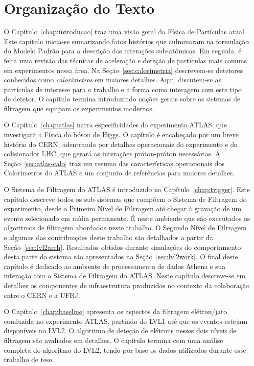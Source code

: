 \section{Organização do Texto}

O Capítulo~\ref{chap:introducao} traz uma visão geral da Física de Partículas
atual. Este capítulo inicia-se sumarizando fatos histórios que culminaram na
formulação do Modelo Padrão para a descrição das interações sub-atômicas. Em
seguida, é feita uma revisão das técnicas de aceleração e deteção de
partículas mais comuns em experimentos nessa área. Na
Seção~\ref{sec:calorimetria} descrevem-se detetores conhecidos como
\textit{calorímetros} em maiores detalhes. Aqui, discutem-se as partículas de
interesse para o trabalho e a forma como interagem com este tipo de detetor. O
capítulo termina introduzindo noções gerais sobre os sistemas de filtragem que
equipam os experimentos modernos.

O Capítulo~\ref{chap:atlas} narra especificidades do experimento ATLAS, que
investigará a Física do bóson de Higgs. O capítulo é encabeçado por um breve
histório do CERN, adentrando por detalhes operacionais do experimento e do
colisionador LHC, que gerará as interações próton-próton necessárias. A
Seção~\ref{sec:atlas-calo} traz um resumo das características operacionais dos
Calorímetros do ATLAS e um conjunto de referências para maiores detalhes.

O Sistema de Filtragem do ATLAS é introduzido no
Capítulo~\ref{chap:trigger}. Este capítulo descreve todos os sub-sistemas que
compõem o Sistema de Filtragem do experimento, desde o Primeiro Nível de
Filtragem até chegar à gravação de um evento selecionado em mídia
permanente. É neste ambiente que são executados os algoritmos de filtragem
abordados neste trabalho. O Segundo Nível de Filtragem e algumas das
contribuições deste trabalho são detalhados a partir da
Seção~\ref{sec:lvl2arch}. Resultados obtidos durante simulações do
comportamento desta parte do sistema são apresentados na
Seção~\ref{sec:lvl2work}. O final deste capítulo é dedicado ao ambiente de
processamento de dados Athena e sua interação com o Sistema de Filtragem do
ATLAS. Neste capítulo descreve-se em detalhes os componentes de infraestrutura
produzidos no contexto da colaboração entre o CERN e a UFRJ.

O Capítulo~\ref{chap:baseline} apresenta os aspectos da filtragem elétron/jato
conduzida no experimento ATLAS, partindo do LVL1 até que os eventos estejam
disponíveis no LVL2. O algoritmo de deteção de elétrons nesses dois níveis de
filtragem são avaliados em detalhes. O capítulo termina com uma análise
completa do algoritmo do LVL2, tendo por base os dados utilizados durante este
trabalho de tese.

